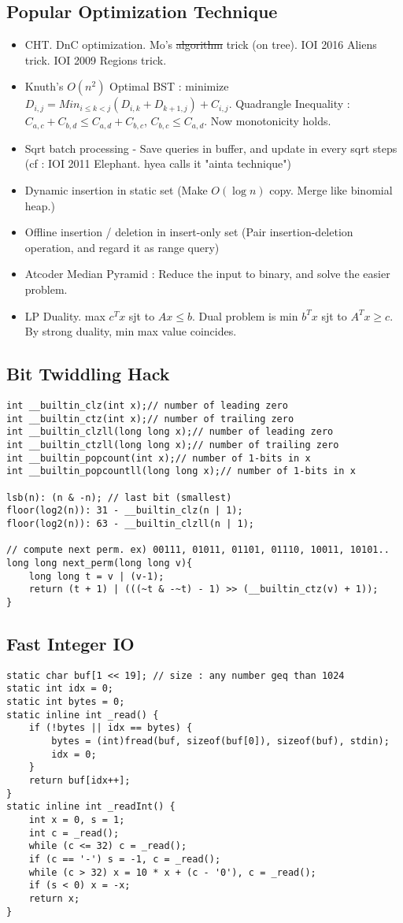 \documentclass[landscape, 8pt, a4paper, oneside, twocolumn]{extarticle}
\begin{document}
\subsection {Popular Optimization Technique}
\begin{itemize}
	\item CHT. DnC optimization. Mo's \sout{algorithm} trick (on tree). IOI 2016 Aliens trick. IOI 2009 Regions trick.
	\item Knuth's $O(n^2)$ Optimal BST : minimize $D_{i, j} = Min_{i \leq k < j}(D_{i, k} + D_{k+1, j}) + C_{i, j}$. Quadrangle Inequality : $C_{a, c} + C_{b, d} \leq C_{a, d} + C_{b, c}$, $C_{b, c} \leq C_{a, d}$. Now monotonicity holds.
	\item Sqrt batch processing - Save queries in buffer, and update in every sqrt steps (cf : IOI 2011 Elephant. hyea calls it "ainta technique")
	\item Dynamic insertion in static set (Make $O(\log n)$ copy. Merge like binomial heap.)
	\item Offline insertion / deletion in insert-only set (Pair insertion-deletion operation, and regard it as range query)
	\item Atcoder Median Pyramid : Reduce the input to binary, and solve the easier problem.
	\item LP Duality. max $c^Tx$ sjt to $Ax \leq b$. Dual problem is min $b^Tx$ sjt to $A^Tx \geq c$. By strong duality, min max value coincides.
\end{itemize}
\subsection {Bit Twiddling Hack}
\begin{verbatim}
int __builtin_clz(int x);// number of leading zero
int __builtin_ctz(int x);// number of trailing zero
int __builtin_clzll(long long x);// number of leading zero
int __builtin_ctzll(long long x);// number of trailing zero
int __builtin_popcount(int x);// number of 1-bits in x
int __builtin_popcountll(long long x);// number of 1-bits in x

lsb(n): (n & -n); // last bit (smallest)
floor(log2(n)): 31 - __builtin_clz(n | 1);
floor(log2(n)): 63 - __builtin_clzll(n | 1);

// compute next perm. ex) 00111, 01011, 01101, 01110, 10011, 10101..
long long next_perm(long long v){
	long long t = v | (v-1);
	return (t + 1) | (((~t & -~t) - 1) >> (__builtin_ctz(v) + 1));
}
\end{verbatim}
\subsection {Fast Integer IO}
\begin{verbatim}
static char buf[1 << 19]; // size : any number geq than 1024
static int idx = 0;
static int bytes = 0;
static inline int _read() {
	if (!bytes || idx == bytes) {
		bytes = (int)fread(buf, sizeof(buf[0]), sizeof(buf), stdin);
		idx = 0;
	}
	return buf[idx++];
}
static inline int _readInt() {
	int x = 0, s = 1;
	int c = _read();
	while (c <= 32) c = _read();
	if (c == '-') s = -1, c = _read();
	while (c > 32) x = 10 * x + (c - '0'), c = _read();
	if (s < 0) x = -x;
	return x;
}
\end{verbatim}
\end{document}

